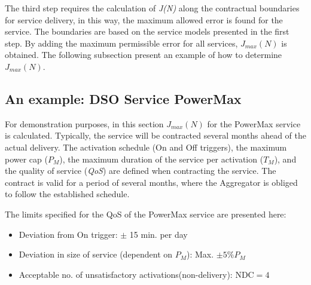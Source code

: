 	The third step requires the calculation of \emph{J(N)} along the contractual boundaries for service delivery, in this way, the maximum allowed error is found for the service. The boundaries are based on the service models presented in the first step. By adding the maximum permissible error for all services, $J_{max}(N)$ is obtained. 
	The following subsection present an example of how to determine $J_{max}(N)$.

	\subsection{An example: DSO Service PowerMax}\label{sub:example}
	For demonstration purposes, in this section $J_{max}(N)$ for the PowerMax service is calculated. 
	Typically, the service will be contracted several months ahead of the actual delivery. The activation schedule (On and Off triggers), the maximum power cap ($P_M$), the maximum duration of the service per activation ($T_M$), and the quality of service (\emph{QoS}) are defined when contracting the service. The contract is valid for a period of several months, where the Aggregator is obliged to follow the established schedule.

	The limits specified for the QoS\cite{ipower2013development} of the PowerMax service are presented here: 
	\begin{itemize}
		\item Deviation from On trigger: $\pm$ 15 min. per day
		\item Deviation in size of service (dependent on $P_M$): Max. $\pm 5\% P_M$  
		\item Acceptable no. of unsatisfactory activations(non-delivery): $\text{NDC} = 4$
	\end{itemize}

